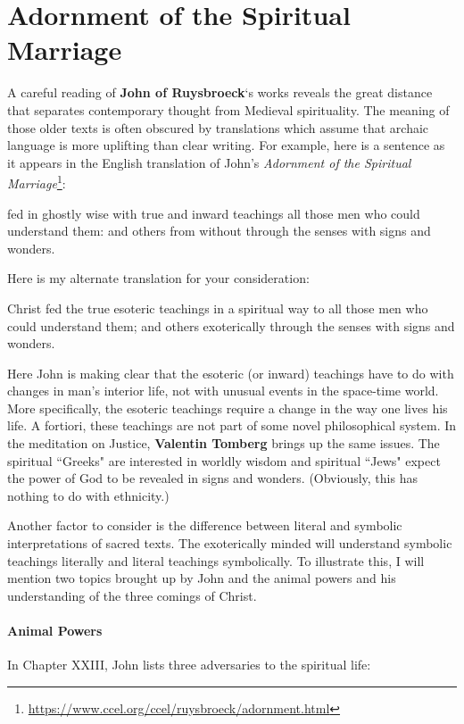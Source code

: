 \section{Adornment of the Spiritual Marriage}

A careful reading of \textbf{John of Ruysbroeck}`s works reveals the great distance that separates contemporary thought from Medieval spirituality. The meaning of those older texts is often obscured by translations which assume that archaic language is more uplifting than clear writing. For example, here is a sentence as it appears in the English translation of John's \emph{Adornment of the Spiritual Marriage}\footnote{\url{https://www.ccel.org/ccel/ruysbroeck/adornment.html}}:

\begin{quotex}
[Christ] fed in ghostly wise with true and inward teachings all those men who could understand them: and others from without through the senses with signs and wonders. 

\end{quotex}
Here is my alternate translation for your consideration:

\begin{quotex}
Christ fed the true esoteric teachings in a spiritual way to all those men who could understand them; and others exoterically through the senses with signs and wonders. 

\end{quotex}
Here John is making clear that the esoteric (or inward) teachings have to do with changes in man's interior life, not with unusual events in the space-time world. More specifically, the esoteric teachings require a change in the way one lives his life. A fortiori, these teachings are not part of some novel philosophical system. In the meditation on Justice, \textbf{Valentin Tomberg} brings up the same issues. The spiritual ``Greeks" are interested in worldly wisdom and spiritual ``Jews" expect the power of God to be revealed in signs and wonders. (Obviously, this has nothing to do with ethnicity.)

Another factor to consider is the difference between literal and symbolic interpretations of sacred texts. The exoterically minded will understand symbolic teachings literally and literal teachings symbolically. To illustrate this, I will mention two topics brought up by John and the animal powers and his understanding of the three comings of Christ.

\paragraph{Animal Powers}
In Chapter XXIII, John lists three adversaries to the spiritual life:

